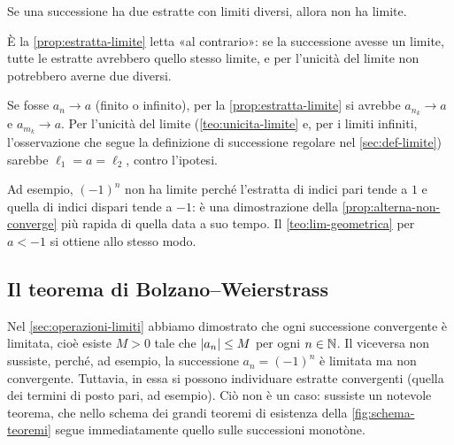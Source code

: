 \begin{corollario}\label{cor:estratte-limiti-diversi}
Se una successione ha due estratte con limiti diversi, allora non ha limite.
\end{corollario}

\begin{schema}
\end{schema}

\begin{strategia}
È la \cref{prop:estratta-limite} letta «al contrario»: se la successione avesse un
limite, tutte le estratte avrebbero quello stesso limite, e per l'unicità del limite non
potrebbero averne due diversi.
\end{strategia}

\begin{dimostrazione}
Se fosse $a_{n}\to a$ (finito o infinito), per la \cref{prop:estratta-limite} si avrebbe
$a_{n_{k}}\to a$ e $a_{m_{k}}\to a$. Per l'unicità del limite (\cref{teo:unicita-limite}
e, per i limiti infiniti, l'osservazione che segue la definizione di successione regolare
nel \cref{sec:def-limite}) sarebbe $\ell_{1}=a=\ell_{2}$, contro l'ipotesi.
\end{dimostrazione}

Ad esempio, $(-1)^{n}$ non ha limite perché l'estratta di indici pari tende a $1$ e quella
di indici dispari tende a $-1$: è una dimostrazione della
\cref{prop:alterna-non-converge} più rapida di quella data a suo tempo. Il
\cref{teo:lim-geometrica} per $a<-1$ si ottiene allo stesso modo.

\subsection{Il teorema di Bolzano--Weierstrass}

Nel \cref{sec:operazioni-limiti} abbiamo dimostrato che ogni successione convergente è
limitata, cioè esiste $M>0$ tale che $\lvert a_{n}\rvert\le M$ per ogni $n\in\mathbb{N}$. Il viceversa non
sussiste, perché, ad esempio, la successione $a_{n}=(-1)^{n}$ è limitata ma non
convergente. Tuttavia, in essa si possono individuare estratte convergenti (quella dei
termini di posto pari, ad esempio). Ciò non è un caso: sussiste un notevole teorema,
che nello schema dei grandi teoremi di esistenza della \cref{fig:schema-teoremi} segue
immediatamente quello sulle successioni monotòne.

